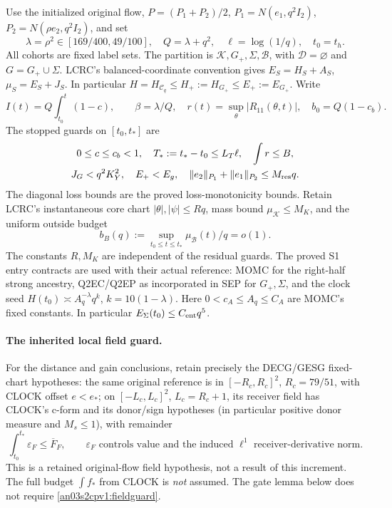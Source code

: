 \documentclass[11pt]{article}
\theoremstyle{remark}\newtheorem{remark}[theorem]{Remark}
\newcommand{\Gp}{G_+}
\newcommand{\KK}{\mathcal K}
\newcommand{\BB}{\mathcal B}
\newcommand{\eps}{\varepsilon}
\begin{document}
Use the initialized original flow, $P=(P_1+P_2)/2$,
$P_1=N(e_1,q^2I_2)$, $P_2=N(\rho e_2,q^2I_2)$, and set
\[
 \lambda=\rho^2\in[169/400,49/100],\quad Q=\lambda+q^2,
 \quad\ell=\log(1/q),\quad t_0=t_h.
\]
All cohorts are fixed label sets. The partition is
$\KK,\Gp,\Sigma,\BB$, with $\mathcal D=\varnothing$ and
$G=\Gp\cup\Sigma$. LCRC's balanced-coordinate convention gives
$E_S=H_S+A_S$, $\mu_S=E_S+J_S$. In particular
$H=H_{\mathcal C_q}\le H_+:=H_{\Gp}\le E_+:=E_{\Gp}$.
Write
\begin{equation}
 I(t)=Q\int_{t_0}^t(1-c),\qquad \beta=\lambda/Q,
 \quad r(t)=\sup_\theta|R_{11}(\theta,t)|,
 \quad b_0=Q(1-c_b).
 \label{an03s2cpv1:clock}
\end{equation}
The stopped guards on $[t_0,t_*]$ are
\begin{equation}
 \begin{gathered}
 0\le c\le c_b<1,\quad T_*:=t_*-t_0\le L_T\ell,\quad \int r\le B,\\
 J_G<q^2K_Y^2,\quad E_+<E_g,\quad
 \|e_2\|_{P_1}+\|e_1\|_{P_2}\le M_{\rm res}q.
 \end{gathered}
 \label{an03s2cpv1:guards}
\end{equation}
The diagonal loss bounds are the proved loss-monotonicity bounds.
Retain LCRC's instantaneous core chart $|\theta|,|\psi|\le Rq$,
mass bound $\mu_{\KK}\le M_K$, and the uniform outside budget
\begin{equation}
 b_B(q):=\sup_{t_0\le t\le t_*}\mu_{\BB}(t)/q=o(1).
 \label{an03s2cpv1:outsideguard}
\end{equation}
The constants $R,M_K$ are independent of the residual guards.
The proved S1 entry contracts are used with their actual reference:
MOMC for the right-half strong ancestry, Q2EC/Q2EP as incorporated
in SEP for $\Gp,\Sigma$, and the clock seed
$H(t_0)\asymp A_q^{-\lambda}q^k$, $k=10(1-\lambda)$.
Here $0<c_A\le A_q\le C_A$ are MOMC's fixed constants.
In particular $E_\Sigma(t_0)\le C_{\rm ent}q^5$.

\paragraph{The inherited local field guard.}
For the distance and gain conclusions, retain precisely the
DECG/GESG fixed-chart hypotheses: the same original reference is
in $[-R_c,R_c]^2$, $R_c=79/51$, with CLOCK offset $e<e_*$;
on $[-L_c,L_c]^2$, $L_c=R_c+1$, its receiver field has CLOCK's
c-form and its donor/sign hypotheses (in particular positive
donor measure and $M_s\le1$), with remainder
\begin{equation}
 \int_{t_0}^{t_*}\eps_F\le\overline F_F,
 \qquad \eps_F\text{ controls value and the induced }
 \ell^1\text{ receiver-derivative norm}.
 \label{an03s2cpv1:fieldguard}
\end{equation}
This is a retained original-flow field hypothesis, not a result
of this increment. The full budget $\int f_*$ from CLOCK is
\emph{not} assumed. The gate lemma below does not require
\eqref{an03s2cpv1:fieldguard}.
\end{document}
